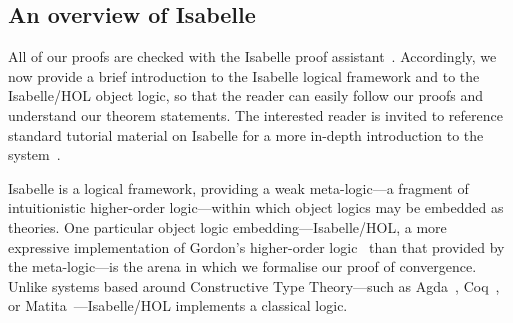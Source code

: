 \documentclass[acmlarge,review,anonymous]{acmart}\settopmatter{printfolios=true}
\begin{document}







\subsection{An overview of Isabelle}
\label{subsect.an.overview.of.isabelle}

All of our proofs are checked with the Isabelle proof assistant~\cite{DBLP:conf/tphol/WenzelPN08}.
Accordingly, we now provide a brief introduction to the Isabelle logical framework and to the Isabelle/HOL object logic, so that the reader can easily follow our proofs and understand our theorem statements.
The interested reader is invited to reference standard tutorial material on Isabelle for a more in-depth introduction to the system~\cite{DBLP:books/sp/NipkowK14}.

Isabelle is a logical framework, providing a weak meta-logic---a fragment of intuitionistic higher-order logic---within which object logics may be embedded as theories.
One particular object logic embedding---Isabelle/HOL, a more expressive implementation of Gordon's higher-order logic~\cite{DBLP:conf/tphol/Gordon91} than that provided by the meta-logic---is the arena in which we formalise our proof of convergence.
Unlike systems based around Constructive Type Theory---such as Agda~\cite{DBLP:conf/tphol/BoveDN09}, Coq~\cite{DBLP:conf/popl/HuetH14}, or Matita~\cite{DBLP:conf/cade/AspertiRCT11}---Isabelle/HOL implements a classical logic.
\end{document}
